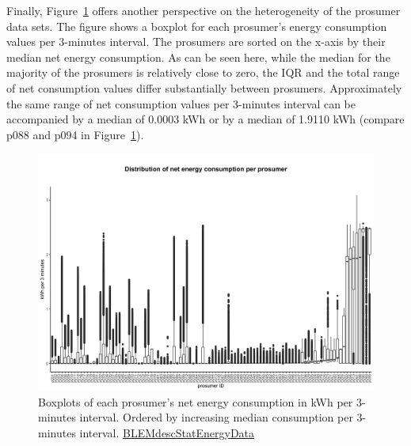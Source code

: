 Finally, Figure~\ref{Fig:pros_boxplots_consumption} offers another perspective on the heterogeneity of the prosumer data sets. The figure shows a boxplot for each prosumer's energy consumption values per 3-minutes interval. The prosumers are sorted on the x-axis by their median net energy consumption. As can be seen here, while the median for the majority of the prosumers is relatively close to zero, the IQR and the total range of net consumption values differ substantially between prosumers. Approximately the same range of net consumption values per 3-minutes interval can be accompanied by a median of 0.0003 kWh or by a median of 1.9110 kWh (compare p088 and p094 in Figure~\ref{Fig:pros_boxplots_consumption}).

\begin{figure}[ht]
 \centering
\includegraphics[width=\textwidth]{thesis/graphs/prosumer_boxplots_consumption.jpg}
\caption[Boxplots of each prosumer's net energy consumption in kWh/3-minutes interval]{Boxplots of each prosumer's net energy consumption in kWh per 3-minutes interval. Ordered by increasing median consumption per 3-minutes interval. \quantnet\href{https://github.com/QuantLet/BLEM/tree/master/BLEMdescStatEnergyData}{BLEMdescStatEnergyData}}
\label{Fig:pros_boxplots_consumption}
\end{figure}

